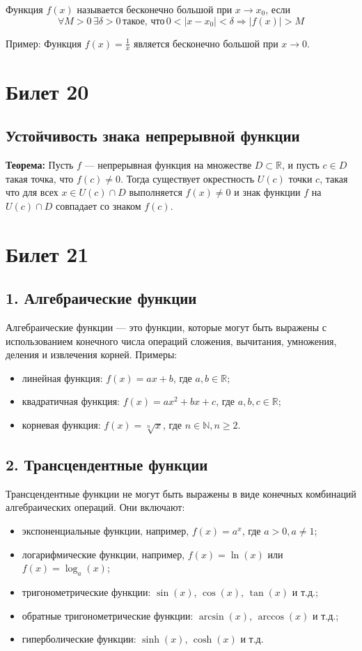 \documentclass{article}
\begin{document}
Функция \( f(x) \) называется бесконечно большой при \( x \to x_0 \), если
\[
\forall M > 0 \, \exists \delta > 0 \, \text{такое, что} \, 0 < |x - x_0| < \delta \Rightarrow |f(x)| > M
\]

Пример:
Функция \( f(x) = \frac{1}{x} \) является бесконечно большой при \( x \to 0 \).


\section{Билет 20}

\subsection*{Устойчивость знака непрерывной функции}

\textbf{Теорема:} Пусть $f$ — непрерывная функция на множестве $D \subset \mathbb{R}$, и пусть $c \in D$ такая точка, что $f(c) \neq 0$. Тогда существует окрестность $U(c)$ точки $c$, такая что для всех $x \in U(c) \cap D$ выполняется $f(x) \neq 0$ и знак функции $f$ на $U(c) \cap D$ совпадает со знаком $f(c)$.


\section{Билет 21}

\subsection*{1. Алгебраические функции}
Алгебраические функции — это функции, которые могут быть выражены с использованием конечного числа операций сложения, вычитания, умножения, деления и извлечения корней. Примеры:
\begin{itemize}
    \item линейная функция: $f(x) = ax + b$, где $a, b \in \mathbb{R}$;
    \item квадратичная функция: $f(x) = ax^2 + bx + c$, где $a, b, c \in \mathbb{R}$;
    \item корневая функция: $f(x) = \sqrt[n]{x}$, где $n \in \mathbb{N}, n \geq 2$.
\end{itemize}

\subsection*{2. Трансцендентные функции}
Трансцендентные функции не могут быть выражены в виде конечных комбинаций алгебраических операций. Они включают:
\begin{itemize}
    \item экспоненциальные функции, например, $f(x) = a^x$, где $a > 0, a \neq 1$;
    \item логарифмические функции, например, $f(x) = \ln(x)$ или $f(x) = \log_a(x)$;
    \item тригонометрические функции: $\sin(x)$, $\cos(x)$, $\tan(x)$ и т.д.;
    \item обратные тригонометрические функции: $\arcsin(x)$, $\arccos(x)$ и т.д.;
    \item гиперболические функции: $\sinh(x)$, $\cosh(x)$ и т.д.
\end{itemize}
\end{document}
